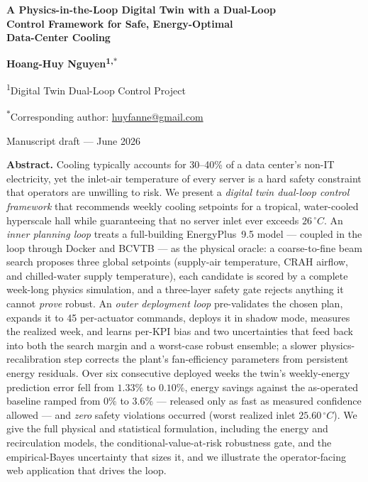 \documentclass[11pt]{article}
\newcommand{\degC}{\ensuremath{^{\circ}}C}
\begin{document}
\begin{titlepage}
\centering
\vspace*{0.6cm}
{\LARGE\bfseries A Physics-in-the-Loop Digital Twin with a Dual-Loop\\[4pt]
Control Framework for Safe, Energy-Optimal\\[4pt]
Data-Center Cooling\par}

\vspace{1.1cm}
{\large\bfseries Hoang-Huy Nguyen\textsuperscript{1,$\ast$}\par}
\vspace{0.5cm}
{\normalsize \textsuperscript{1}Digital Twin Dual-Loop Control Project\par}
{\normalsize \textsuperscript{$\ast$}Corresponding author: \href{mailto:huyfanne@gmail.com}{huyfanne@gmail.com}\par}

\vspace{1.0cm}
{\normalsize Manuscript draft --- June 2026\par}

\vspace{1.2cm}
\begin{minipage}{0.86\textwidth}
\small
\noindent\textbf{Abstract.}
Cooling typically accounts for 30--40\% of a data center's non-IT electricity, yet
the inlet-air temperature of every server is a hard safety constraint that operators
are unwilling to risk. We present a \emph{digital twin dual-loop control framework}
that recommends weekly cooling setpoints for a tropical, water-cooled hyperscale hall
while guaranteeing that no server inlet ever exceeds \(26\,\degC\). An \emph{inner
planning loop} treats a full-building EnergyPlus~9.5 model --- coupled in the loop
through Docker and BCVTB --- as the physical oracle: a coarse-to-fine beam search
proposes three global setpoints (supply-air temperature, CRAH airflow, and
chilled-water supply temperature), each candidate is scored by a complete
week-long physics simulation, and a three-layer safety gate rejects anything it cannot
\emph{prove} robust. An \emph{outer deployment loop} pre-validates the chosen plan,
expands it to 45 per-actuator commands, deploys it in shadow mode, measures the realized
week, and learns per-KPI bias and two uncertainties that feed back into both the search
margin and a worst-case robust ensemble; a slower physics-recalibration step corrects
the plant's fan-efficiency parameters from persistent energy residuals. Over six
consecutive deployed weeks the twin's weekly-energy prediction error fell from
\(1.33\%\) to \(0.10\%\), energy savings against the as-operated baseline ramped from
\(0\%\) to \(3.6\%\) --- released only as fast as measured confidence allowed --- and
\emph{zero} safety violations occurred (worst realized inlet \(25.60\,\degC\)).
We give the full physical and statistical formulation, including the energy and
recirculation models, the conditional-value-at-risk robustness gate, and the
empirical-Bayes uncertainty that sizes it, and we illustrate the operator-facing web
application that drives the loop.


\end{minipage}
\end{titlepage}
\end{document}
